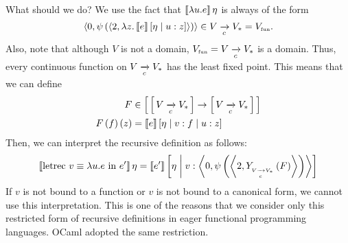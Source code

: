 \begin{enumcirc}
	What should we do?
	We use the fact that $\left\llbracket \lambda u . e \right\rrbracket \eta$ is always of the form
	\[
		\left\langle 0, \psi \left( \left\langle 2, \lambda z . \left\llbracket e \right\rrbracket \left[ \eta \; \middle\vert \; u: z \right] \right\rangle \right) \right\rangle
		\in V \xrightarrow[c]{} V_* = V_{\textrm{\tiny fun}}.
	\]
	Also, note that although $V$ is not a domain, $V_{\textrm{\tiny fun}} = V \xrightarrow[c]{} V_*$
	is a domain.
	Thus, every continuous function on $V \xrightarrow[c]{} V_*$ has the least fixed point.
	This means that we can define
	\begin{align*}
		F                     & \in \left[ \, \left[ \, V \xrightarrow[c]{} V_* \, \right] \to \left[ \, V \xrightarrow[c]{} V_* \, \right] \, \right] \\
		F \left( f \right) \left( z \right) & = \left\llbracket e \right\rrbracket\left[ \eta \; \middle\vert \; v: f \; \middle\vert \; u: z \right]
	\end{align*}
	Then, we can interpret the recursive definition as follows:
	\[
		\left\llbracket \textrm{letrec } v \equiv \lambda u . e \textrm{ in } e' \right\rrbracket \eta =
		\left\llbracket e' \right\rrbracket \left[ \eta \; \middle\vert \; v: \left\langle 0, \psi\left( \left\langle 2, Y_{\textrm{\tiny \ensuremath{{}_{V \xrightarrow[c]{} V_*}}}}\left( F \right) \right\rangle \right) \right\rangle \right]
	\]
	If $v$ is not bound to a function or $v$ is not bound to a canonical form, we
	cannot use this interpretation.
	This is one of the reasons that we consider only this restricted form of
	recursive definitions in eager functional programming languages.
	OCaml adopted the same restriction.
\end{enumcirc}

